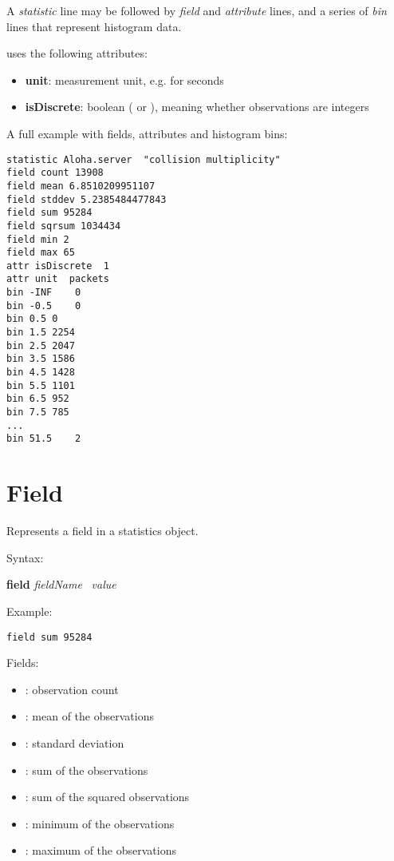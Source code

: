 A \textit{statistic} line may be followed by \textit{field} and \textit{attribute} lines,
and a series of \textit{bin} lines that represent histogram data.

{\opp} uses the following attributes:

\begin{itemize}
    \item \textbf{unit}: measurement unit, e.g.  for seconds
    \item \textbf{isDiscrete}: boolean ( or ), meaning whether
          observations are integers
\end{itemize}

A full example with fields, attributes and histogram bins:

\begin{verbatim}
statistic Aloha.server 	"collision multiplicity"
field count 13908
field mean 6.8510209951107
field stddev 5.2385484477843
field sum 95284
field sqrsum 1034434
field min 2
field max 65
attr isDiscrete  1
attr unit  packets
bin	-INF	0
bin	-0.5	0
bin	0.5	0
bin	1.5	2254
bin	2.5	2047
bin	3.5	1586
bin	4.5	1428
bin	5.5	1101
bin	6.5	952
bin	7.5	785
...
bin	51.5	2
\end{verbatim}


\section{Field}

Represents a field in a statistics object.

Syntax:

\hspace{20mm} \textbf{field} \textit{fieldName} \ \textit{value}

Example:

\begin{verbatim}
field sum 95284
\end{verbatim}

Fields:

\begin{itemize}
    \item {}: observation count
    \item {}: mean of the observations
    \item {}: standard deviation
    \item {}: sum of the observations
    \item {}: sum of the squared observations
    \item {}: minimum of the observations
    \item {}: maximum of the observations
\end{itemize}


